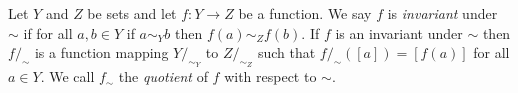 \documentclass[../paper.tex]{subfiles}
\begin{document}
Let $Y$ and $Z$ be sets and let $f : Y \rightarrow Z$ be a function. We say $f$
is \emph{invariant} under $\sim$ if for all $a, b \in Y$ if $a \sim_Y b$ then
$f(a) \sim_Z f(b)$. If $f$ is an invariant under $\sim$ then $f /_{\sim}$ is a
function mapping $Y /_{\sim_Y} $ to $ Z /_{\sim_Z}$ such that $f /_{\sim} ([a]) =
[f(a)]$ for all $a \in Y$. We call $f_{\sim}$ the \emph{quotient} of $f$ with
respect to $\sim$.




\end{document}
